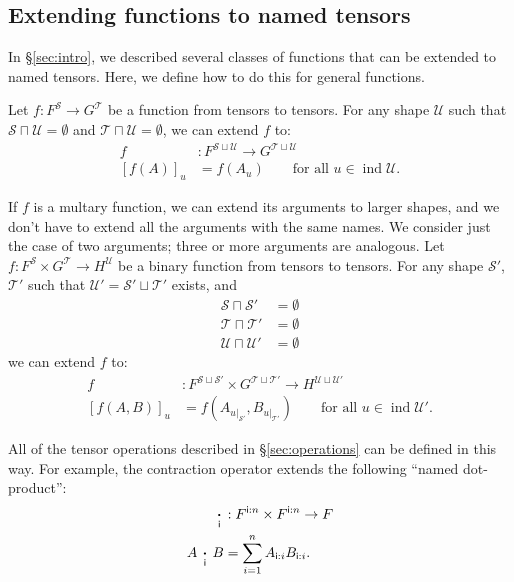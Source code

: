 \documentclass{article}
\newcommand{\name}[1]{\mathsf{#1}}
\newcommand{\ndot}[1]{\mathbin{\mathop{\thinspace\boldsymbol\cdot\thinspace}\displaylimits_{\name{#1}}}}
\DeclareMathOperator{\tupleshape}{ind}
\newcommand{\tuplerestrict}[2]{\left.#1\right|_{#2}}
\begin{document}
\subsection{Extending functions to named tensors}
\label{sec:tensorfunctions}

In \S\ref{sec:intro}, we described several classes of functions that can be extended to named tensors. Here, we define how to do this for general functions.

Let $f \colon F^{\mathcal{S}} \rightarrow G^{\mathcal{T}}$ be a function from tensors to tensors. For any shape $\mathcal{U}$ such that $\mathcal{S} \sqcap \mathcal{U} = \emptyset$ and $\mathcal{T} \sqcap \mathcal{U} = \emptyset$, we can extend $f$ to:
\begin{align*}
f &: F^{\mathcal{S} \sqcup \mathcal{U}} \rightarrow G^{\mathcal{T} \sqcup \mathcal{U}} \\
[f(A)]_u &= f(A_u) \qquad \text{for all $u \in \tupleshape\mathcal{U}$.}
\end{align*}

If $f$ is a multary function, we can extend its arguments to larger shapes, and we don't have to extend all the arguments with the same names. We consider just the case of two arguments; three or more arguments are analogous. Let $f \colon F^{\mathcal{S}} \times G^{\mathcal{T}} \rightarrow H^{\mathcal{U}}$ be a binary function from tensors to tensors. For any shape $\mathcal{S'}$, $\mathcal{T'}$ such that $\mathcal{U'} = \mathcal{S'} \sqcup \mathcal{T'}$ exists, and 
\begin{align*}
\mathcal{S} \sqcap \mathcal{S'} &= \emptyset \\
\mathcal{T} \sqcap \mathcal{T'} &= \emptyset \\
\mathcal{U} \sqcap \mathcal{U'} &= \emptyset \end{align*}
we can extend $f$ to:
\begin{align*}
f &: F^{\mathcal{S} \sqcup \mathcal{S'}} \times G^{\mathcal{T} \sqcup \mathcal{T'}} \rightarrow H^{\mathcal{U} \sqcup \mathcal{U'}} \\
  [f(A,B)]_u &= f\left(A_{\tuplerestrict{u}{\mathcal{S'}}},B_{\tuplerestrict{u}{\mathcal{T'}}}\right) \qquad \text{for all $u \in \tupleshape\mathcal{U'}$.}
\end{align*}

All of the tensor operations described in \S\ref{sec:operations} can be defined in this way. For example, the contraction operator extends the following ``named dot-product'':
\begin{align*}
\ndot{i} &: F^{\name{i}:n} \times F^{\name{i}:n} \rightarrow F \\
A \ndot{i} B &= \sum_{i=1}^n A_{\name{i}:i} B_{\name{i}:i}.
\end{align*}
\end{document}
